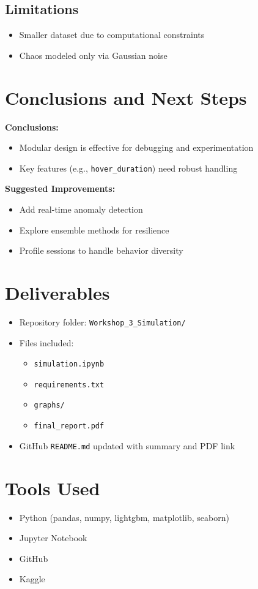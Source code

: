 \documentclass[12pt]{article}
\begin{document}
	\subsection{Limitations}
	\begin{itemize}
		\item Smaller dataset due to computational constraints
		\item Chaos modeled only via Gaussian noise
	\end{itemize}
	
	\section{Conclusions and Next Steps}
	
	\textbf{Conclusions:}
	\begin{itemize}
		\item Modular design is effective for debugging and experimentation
		\item Key features (e.g., \texttt{hover\_duration}) need robust handling
	\end{itemize}
	
	\textbf{Suggested Improvements:}
	\begin{itemize}
		\item Add real-time anomaly detection
		\item Explore ensemble methods for resilience
		\item Profile sessions to handle behavior diversity
	\end{itemize}
	
	\section{Deliverables}
	\begin{itemize}
		\item Repository folder: \texttt{Workshop\_3\_Simulation/}
		\item Files included:
		\begin{itemize}
			\item \texttt{simulation.ipynb}
			\item \texttt{requirements.txt}
			\item \texttt{graphs/}
			\item \texttt{final\_report.pdf}
		\end{itemize}
		\item GitHub \texttt{README.md} updated with summary and PDF link
	\end{itemize}
	
	\section*{Tools Used}
	\begin{itemize}
		\item Python (pandas, numpy, lightgbm, matplotlib, seaborn)
		\item Jupyter Notebook
		\item GitHub
		\item Kaggle
	\end{itemize}
	
\end{document}
